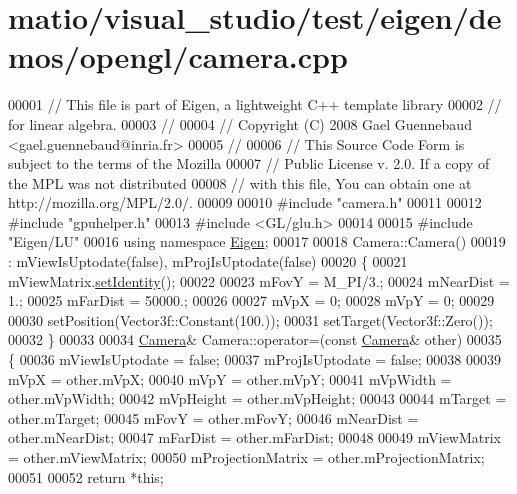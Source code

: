 \hypertarget{matio_2visual__studio_2test_2eigen_2demos_2opengl_2camera_8cpp_source}{}\section{matio/visual\+\_\+studio/test/eigen/demos/opengl/camera.cpp}
\label{matio_2visual__studio_2test_2eigen_2demos_2opengl_2camera_8cpp_source}

\begin{DoxyCode}
00001 \textcolor{comment}{// This file is part of Eigen, a lightweight C++ template library}
00002 \textcolor{comment}{// for linear algebra.}
00003 \textcolor{comment}{//}
00004 \textcolor{comment}{// Copyright (C) 2008 Gael Guennebaud <gael.guennebaud@inria.fr>}
00005 \textcolor{comment}{//}
00006 \textcolor{comment}{// This Source Code Form is subject to the terms of the Mozilla}
00007 \textcolor{comment}{// Public License v. 2.0. If a copy of the MPL was not distributed}
00008 \textcolor{comment}{// with this file, You can obtain one at http://mozilla.org/MPL/2.0/.}
00009 
00010 \textcolor{preprocessor}{#include "camera.h"}
00011 
00012 \textcolor{preprocessor}{#include "gpuhelper.h"}
00013 \textcolor{preprocessor}{#include <GL/glu.h>}
00014 
00015 \textcolor{preprocessor}{#include "Eigen/LU"}
00016 \textcolor{keyword}{using namespace }\hyperlink{namespace_eigen}{Eigen};
00017 
00018 Camera::Camera()
00019     : mViewIsUptodate(false), mProjIsUptodate(false)
00020 \{
00021     mViewMatrix.\hyperlink{group___geometry___module_a4f0c6b74994904b56b621cf3d9ac4a0f}{setIdentity}();
00022     
00023     mFovY = M\_PI/3.;
00024     mNearDist = 1.;
00025     mFarDist = 50000.;
00026     
00027     mVpX = 0;
00028     mVpY = 0;
00029 
00030     setPosition(Vector3f::Constant(100.));
00031     setTarget(Vector3f::Zero());
00032 \}
00033 
00034 \hyperlink{class_camera}{Camera}& Camera::operator=(\textcolor{keyword}{const} \hyperlink{class_camera}{Camera}& other)
00035 \{
00036     mViewIsUptodate = \textcolor{keyword}{false};
00037     mProjIsUptodate = \textcolor{keyword}{false};
00038     
00039     mVpX = other.mVpX;
00040     mVpY = other.mVpY;
00041     mVpWidth = other.mVpWidth;
00042     mVpHeight = other.mVpHeight;
00043 
00044     mTarget = other.mTarget;
00045     mFovY = other.mFovY;
00046     mNearDist = other.mNearDist;
00047     mFarDist = other.mFarDist;
00048     
00049     mViewMatrix = other.mViewMatrix;
00050     mProjectionMatrix = other.mProjectionMatrix;
00051 
00052     \textcolor{keywordflow}{return} *\textcolor{keyword}{this};

\end{DoxyCode}
